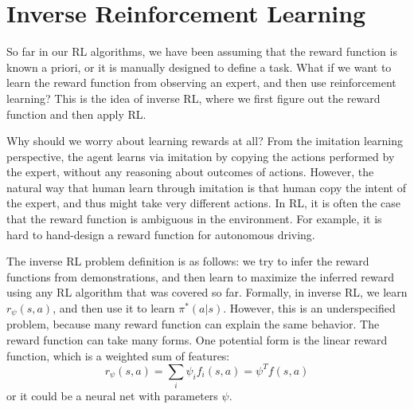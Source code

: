 \chapter{Inverse Reinforcement Learning}
So far in our RL algorithms, we have been assuming that the reward function is known a priori, or it is manually designed to define a task. What if we want to learn the reward function from observing an expert, and then use reinforcement learning? This is the idea of inverse RL, where we first figure out the reward function and then apply RL. 

Why should we worry about learning rewards at all? From the imitation learning perspective, the agent learns via imitation by copying the actions performed by the expert, without any reasoning about outcomes of actions. However, the natural way that human learn through imitation is that human copy the intent of the expert, and thus might take very different actions. In RL, it is often the case that the reward function is ambiguous in the environment. For example, it is hard to hand-design a reward function for autonomous driving. 

The inverse RL problem definition is as follows: we try to infer the reward functions from demonstrations, and then learn to maximize the inferred reward using any RL algorithm that was covered so far. Formally, in inverse RL, we learn $r_\psi(s,a)$, and then use it to learn $\pi^*(a|s)$. However, this is an underspecified problem, because many reward function can explain the same behavior. The reward function can take many forms. One potential form is the linear reward function, which is a weighted sum of features:
\[
r_\psi(s,a) = \sum_i\psi_if_i(s,a) = \psi^Tf(s,a)
\]
or it could be a neural net with parameters $\psi$.

